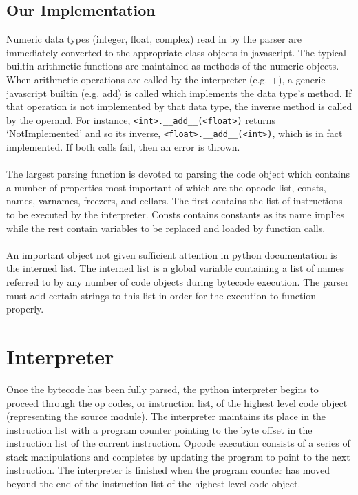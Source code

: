 \documentclass{article}
\begin{document}
\subsection{Our Implementation}

Numeric data types (integer, float, complex) read in by the parser are immediately converted to the appropriate class objects in javascript.  The typical builtin arithmetic functions are maintained as methods of the numeric objects.  When arithmetic operations are called by the interpreter (e.g. +), a generic javascript builtin (e.g. add) is called which implements the data type's method.  If that operation is not implemented by that data type, the inverse method is called by the operand.  For instance, \verb!<int>.__add__(<float>)! returns `NotImplemented' and so its inverse, \verb!<float>.__add__(<int>)!, which is in fact implemented.  If both calls fail, then an error is thrown.\\
\\
The largest parsing function is devoted to parsing the code object which contains a number of properties most important of which are the opcode list, consts, names, varnames, freezers, and cellars.  The first contains the list of instructions to be executed by the interpreter.  Consts contains constants as its name implies while the rest contain variables to be replaced and loaded by function calls.\\
\\
An important object not given sufficient attention in python documentation is the interned list.  The interned list is a global variable containing a list of names referred to by any number of code objects during bytecode execution.  The parser must add certain strings to this list in order for the execution to function properly.

\section{Interpreter}

Once the bytecode has been fully parsed, the python interpreter begins to proceed through the op codes, or instruction list, of the highest level code object (representing the source module).  The interpreter maintains its place in the instruction list with a program counter pointing to the byte offset in the instruction list of the current instruction.  Opcode execution consists of a series of stack manipulations and completes by updating the program to point to the next instruction.  The interpreter is finished when the program counter has moved beyond the end of the instruction list of the highest level code object.
\end{document}
